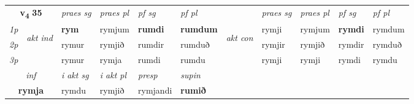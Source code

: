 \noindent
\begin{tabular}{lllllllllll} \toprule
\multicolumn{2}{c}{\textbf{v{\textsubscript{4}}} \Large{\textbf{35}}}  &  \textit{praes sg}  & \textit{praes pl}  &\textit{ pf sg} & \textit{pf pl} &  &  \textit{praes sg}  & \textit{praes pl}  & \textit{pf sg} & \textit{pf pl } \\*
	\cmidrule{3-6} \cmidrule{8-11}
 {\textit{1p}} & \multirow{3}{*}{\begin{turn}{90}\textit{akt ind}\end{turn}} & \textbf{rym} & rymjum & \textbf{rumdi} & \textbf{rumdum} & \multirow{3}{*}{\begin{turn}{90}\textit{akt con}\end{turn}} &rymji & rymjum & \textbf{rymdi} & rymdum\\*
 {\textit{2p}} &  &  rymur  & rymjið & rumdir & rumduð & & rymjir & rymjið & rymdir & rymduð \\*
{\textit{3p}} &  & rymur & rymja & rumdi & rumdu & & rymji & rymji& rymdi & rymdu \\*
\cmidrule{3-6} \cmidrule{8-11}

   \multicolumn{2}{c}{\textit{inf}}  & \textit{i akt sg} & \textit{i akt pl}   & \textit{presp} & \textit{supin}   \\*
  \multicolumn{2}{c}{\textbf{rymja}} & rymdu  & rymjið   & rymjandi &  \textbf{rumið}   \\*
\end{tabular}

